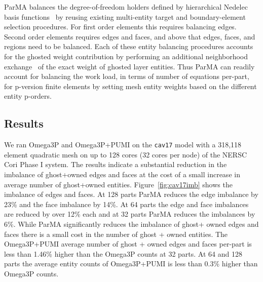 \documentclass[review,12pt]{elsarticle_summary_report}
\begin{document}
ParMA balances the degree-of-freedom holders defined by 
hierarchical Nedelec basis functions~\cite{ingelstrom2006new,ko2010advances} by
reusing existing multi-entity target and boundary-element selection
procedures.
For first order elements this requires balancing edges.
Second order elements requires edges and faces, and above that edges, faces, and
regions need to be balanced. 
Each of these entity balancing procedures accounts for the ghosted weight
contribution by performing an additional neighborhood
exchange~\cite{ibanez2014hybrid} of the exact weight of ghosted layer entities.
Thus ParMA can readily account for balancing the work load, in terms of number
of equations per-part, for p-version finite elements by setting mesh entity
weights based on the different entity p-orders. 

\subsection{\label{load_balance_results} Results}

We ran Omega3P and Omega3P+PUMI on the \texttt{cav17} model with a 318,118
element quadratic mesh on up to 128 cores (32 cores per node) of the NERSC Cori
Phase I system. The results indicate a substantial reduction in the imbalance of ghost+owned edges and faces at the cost of a small increase in average number of ghost+owned entities.
Figure~\ref{fig:cav17imb} shows the imbalance of edges and faces.
At 128 parts ParMA reduces the edge imbalance by 23\%  and the face
imbalance by 14\%.
At 64 parts the edge and face imbalances are reduced by over 12\% each and
at 32 parts ParMA reduces the imbalances by 6\%.
While ParMA significantly reduces the imbalance of ghost+ owned edges and faces
there is a small cost in the number of ghost + owned entities.
The Omega3P+PUMI average number of ghost + owned edges and faces per-part
is less than 1.46\% higher than the Omega3P counts at 32 parts.
At 64 and 128 parts the average entity counts of Omega3P+PUMI is less than 0.3\%
higher than Omega3P counts.
\end{document}
